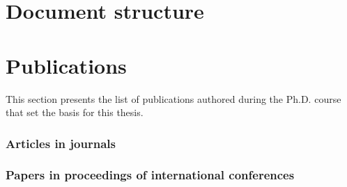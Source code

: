 \section{Document structure}

\section{Publications}

This section presents the list of publications authored during the
Ph.D. course that set the basis for this thesis.

\subsubsection*{Articles in journals}

\subsubsection*{Papers in proceedings of international conferences}

